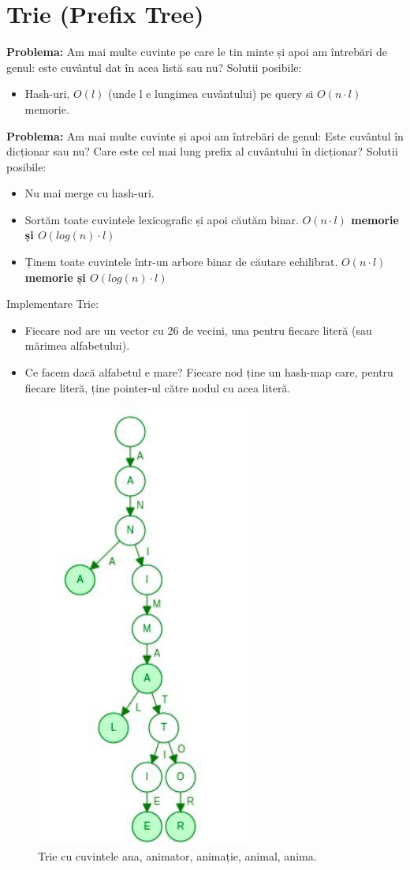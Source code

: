 \documentclass[11pt,a4paper]{article}
\theoremstyle{definition}
\theoremstyle{plain}
\theoremstyle{remark}
\begin{document}
\section{Trie (Prefix Tree)}
\textbf{Problema:} Am mai multe cuvinte pe care le tin minte și apoi am întrebări de genul: este cuvântul dat în acea listă sau nu? Solutii posibile:
\begin{itemize}
    \item Hash-uri, $O(l)$ (unde l e lungimea cuvântului) pe query si $O(n \cdot l)$ memorie.
\end{itemize}

\textbf{Problema: }
Am mai multe cuvinte și apoi am întrebări de genul:
Este cuvântul în dicționar sau nu? Care este cel mai lung preﬁx al cuvântului în dicționar? Solutii posibile:

\begin{itemize}
    \item Nu mai merge cu hash-uri.
    \item Sortăm toate cuvintele lexicograﬁc și apoi căutăm binar. \textbf{$O(n \cdot l)$ memorie și $O(log(n) \cdot l)$}
    \item Ținem toate cuvintele într-un arbore binar de căutare echilibrat. \textbf{$O(n \cdot l)$ memorie și $O(log(n) \cdot l)$}
\end{itemize}

Implementare Trie:
\begin{itemize}
    \item Fiecare nod are un vector cu 26 de vecini, una pentru ﬁecare literă (sau mărimea alfabetului).
    \item Ce facem dacă alfabetul e mare? Fiecare nod ține un hash-map care, pentru ﬁecare literă, ține pointer-ul către nodul cu acea literă.
\end{itemize}

\begin{figure}[H]
    \centering
    \includegraphics[width=0.3\linewidth]{trie.png}
    \caption{Trie cu cuvintele ana, animator, animație, animal, anima.}
    \label{fig:enter-label}
\end{figure}
\end{document}
